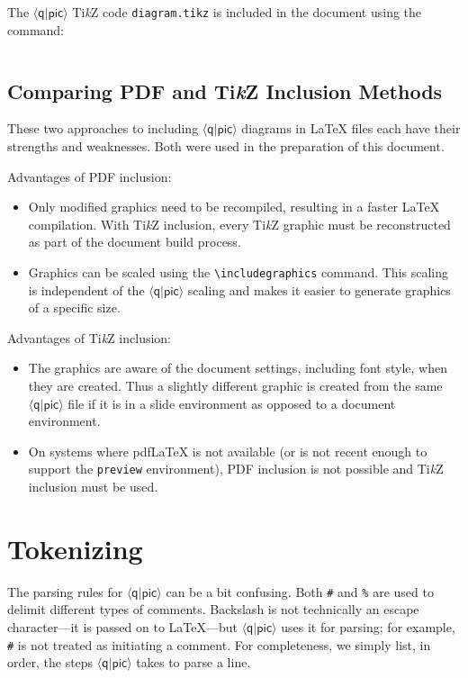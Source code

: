 \documentclass[twoside,12pt]{article}
\newcommand{\qpic}{$\langle\mathsf{q}|\mathsf{pic}\rangle$\xspace}
\newcommand{\TikZ}{Ti\emph{k}Z\xspace}
\begin{document}
The \qpic \TikZ code {\tt diagram.tikz} is included in the document using the command:

\begin{minipage}{5in}
\begin{lstlisting}[basicstyle=\ttfamily]

\end{lstlisting}
\end{minipage}

\subsection{Comparing PDF and \TikZ Inclusion Methods}
These two approaches to including \qpic diagrams in {\LaTeX} files each have their strengths and weaknesses.  Both were used in the preparation of this document.


Advantages of PDF inclusion:
\begin{itemize}
\item Only modified graphics need to be recompiled, resulting in a faster {\LaTeX} compilation. With \TikZ inclusion, every \TikZ graphic must be reconstructed as part of the document build process.
\item Graphics can be scaled using the \verb|\includegraphics| command. This scaling is independent of the \qpic scaling and makes it easier to generate graphics of a specific size.
\end{itemize}


Advantages of \TikZ inclusion:
\begin{itemize}
\item The graphics are aware of the document settings, including font style, when they are created. Thus a slightly different graphic is created from the same \qpic file if it is in a slide environment as opposed to a document environment.
\item On systems where pdf{\LaTeX} is not available (or is not recent enough to support the \verb|preview| environment), PDF inclusion is not possible and \TikZ inclusion must be used.
\end{itemize}



\section{Tokenizing}
\label{sec-tokens}

The parsing rules for \qpic can be a bit confusing.  Both {\tt \#} and {\tt \%} are used to delimit different
types of comments.  Backslash is not technically an escape character---it is passed on to \LaTeX---but \qpic
uses it for parsing; for example, {\tt {}\#} is not treated as initiating a comment.  For completeness,
we simply list, in order, the steps \qpic takes to parse a line.
\end{document}
